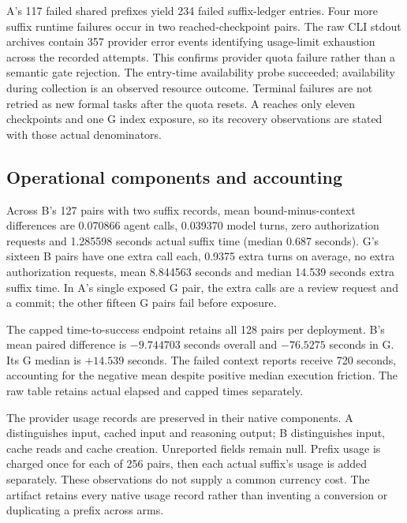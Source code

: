 \documentclass[11pt,a4paper]{article}
\begin{document}
A's 117 failed shared prefixes yield 234 failed suffix-ledger entries. Four more suffix runtime failures occur in two reached-checkpoint pairs. The raw CLI stdout archives contain 357 provider error events identifying usage-limit exhaustion across the recorded attempts. This confirms provider quota failure rather than a semantic gate rejection. The entry-time availability probe succeeded; availability during collection is an observed resource outcome. Terminal failures are not retried as new formal tasks after the quota resets. A reaches only eleven checkpoints and one G index exposure, so its recovery observations are stated with those actual denominators.

\subsection{Operational components and accounting}
Across B's 127 pairs with two suffix records, mean bound-minus-context differences are 0.070866 agent calls, 0.039370 model turns, zero authorization requests and 1.285598 seconds actual suffix time (median 0.687 seconds). G's sixteen B pairs have one extra call each, 0.9375 extra turns on average, no extra authorization requests, mean 8.844563 seconds and median 14.539 seconds extra suffix time. In A's single exposed G pair, the extra calls are a review request and a commit; the other fifteen G pairs fail before exposure.

The capped time-to-success endpoint retains all 128 pairs per deployment. B's mean paired difference is $-9.744703$ seconds overall and $-76.5275$ seconds in G. Its G median is $+14.539$ seconds. The failed context reports receive 720 seconds, accounting for the negative mean despite positive median execution friction. The raw table retains actual elapsed and capped times separately.

The provider usage records are preserved in their native components. A distinguishes input, cached input and reasoning output; B distinguishes input, cache reads and cache creation. Unreported fields remain null. Prefix usage is charged once for each of 256 pairs, then each actual suffix's usage is added separately. These observations do not supply a common currency cost. The artifact retains every native usage record rather than inventing a conversion or duplicating a prefix across arms.
\end{document}
